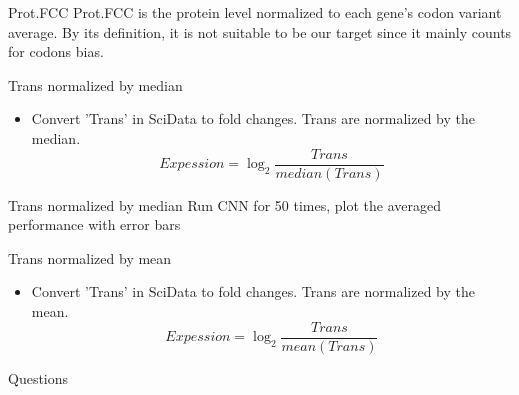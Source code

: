 \documentclass[xcolor=svgnames,handout]{beamer}
\begin{document}
 \begin{frame}{Prot.FCC}
  Prot.FCC is the protein level normalized to each gene's codon variant average. By its definition, it is not suitable to be our target since it mainly counts for codons bias. 
 \end{frame}
  
  \begin{frame}{Trans normalized by median}
  
  \begin{itemize}
  \item Convert 'Trans' in SciData to fold changes. Trans are normalized by the median.
    \begin{equation}
    Expession=\log_2\frac{Trans}{median(Trans)}
    \end{equation}
  \end{itemize}
  
  \end{frame}
\begin{frame}{Trans normalized by median}
Run CNN for 50 times, plot the averaged performance with error bars

\end{frame}


\begin{frame}{Trans normalized by mean}
 \begin{itemize}
  \item Convert 'Trans' in SciData to fold changes. Trans are normalized by the mean.
    \begin{equation}
    Expession=\log_2\frac{Trans}{mean(Trans)}
    \end{equation}
  \end{itemize}
\end{frame}

\begin{frame}
  {Questions}

  \nocite{lorem,ipsum}
  
  

\end{frame}
\end{document}
